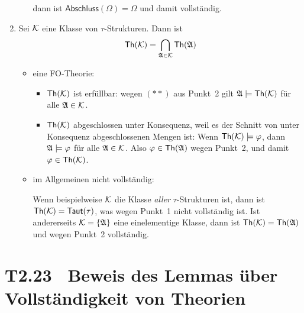 \documentclass[fontsize=11pt, twoside=false, numbers=autoenddot]{scrbook}
\begin{document}
\begin{enumerate}
\begin{itemize}
        dann ist $\textsf{Abschluss}(\Omega) = \Omega$ und damit vollständig.
    \end{itemize}
    \par\smallskip
  \item
    Sei $\mathcal{K}$ eine Klasse von $\tau$-Strukturen. Dann ist
    \[
      \textsf{Th}(\mathcal{K}) = \bigcap_{\mathfrak{A} \in \mathcal{K}} \textsf{Th}(\mathfrak{A})
    \]
    \begin{itemize}
      \item
        eine FO-Theorie:
        \par
        \begin{itemize}
          \item
            $\textsf{Th}(\mathcal{K})$ ist erfüllbar: wegen $(**)$ aus Punkt~2 gilt 
            $\mathfrak{A} \models \textsf{Th}(\mathcal{K})$ für alle $\mathfrak{A} \in \mathcal{K}$.
          \item
            $\textsf{Th}(\mathcal{K})$ abgeschlossen unter Konsequenz, weil es der Schnitt von unter Konsequenz abgeschlossenen Mengen ist:
            Wenn $\textsf{Th}(\mathcal{K}) \models \varphi$, dann $\mathfrak{A} \models \varphi$
            für alle $\mathfrak{A} \in \mathcal{K}$.
            Also $\varphi \in \textsf{Th}(\mathfrak{A})$ wegen Punkt~2,
            und damit $\varphi \in \textsf{Th}(\mathcal{K})$.
        \end{itemize}
        \par\smallskip
      \item
        im Allgemeinen nicht vollständig:
        \par
        Wenn beispielweise $\mathcal{K}$ die Klasse \emph{aller} $\tau$-Strukturen ist,
        dann ist $\textsf{Th}(\mathcal{K}) = \textsf{Taut}(\tau)$,
        was wegen Punkt~1 nicht vollständig ist.
        Ist andererseits $\mathcal{K}=\{\mathfrak{A}\}$ eine einelementige Klasse,
        dann ist $\textsf{Th}(\mathcal{K}) = \textsf{Th}(\mathfrak{A})$ und wegen Punkt~2 vollständig.
    \end{itemize}
\end{enumerate}

\section*{T2.23~ Beweis des Lemmas über Vollständigkeit von Theorien}
\end{document}
